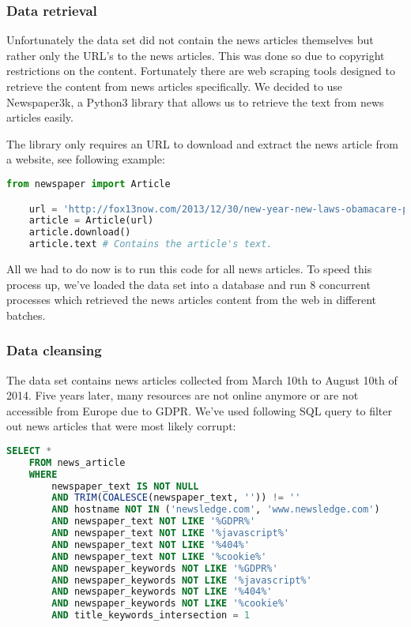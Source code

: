 \subsubsection{Data retrieval}
Unfortunately the data set did not contain the news articles themselves but rather only the URL's to the news articles.
This was done so due to copyright restrictions on the content.
Fortunately there are web scraping tools designed to retrieve the content from news articles specifically.
We decided to use Newspaper3k\cite{newspaper3k},
a Python3 library that allows us to retrieve the text from news articles easily.

The library only requires an URL to download and extract the news article from a website, see following example:

\begin{lstlisting}[language=Python, caption=Retrieve the news article from an URL., label={lst:newspaper3k_code}]
    from newspaper import Article

    url = 'http://fox13now.com/2013/12/30/new-year-new-laws-obamacare-pot-guns-and-drones/'
    article = Article(url)
    article.download()
    article.text # Contains the article's text.
\end{lstlisting}

All we had to do now is to run this code for all news articles.
To speed this process up, we've loaded the data set into a database and run 8 concurrent processes which
retrieved the news articles content from the web in different batches.

\subsubsection{Data cleansing}
The data set contains news articles collected from March 10th to August 10th of 2014.
Five years later, many resources are not online anymore or are not accessible from Europe due to GDPR.
We've used following SQL query to filter out news articles that were most likely corrupt:

\begin{lstlisting}[language=SQL, caption=Retrieve valid news articles., label={lst:valid_news_articles_sql}]
    SELECT *
    FROM news_article
    WHERE
        newspaper_text IS NOT NULL
        AND TRIM(COALESCE(newspaper_text, '')) != ''
        AND hostname NOT IN ('newsledge.com', 'www.newsledge.com')
        AND newspaper_text NOT LIKE '%GDPR%'
        AND newspaper_text NOT LIKE '%javascript%'
        AND newspaper_text NOT LIKE '%404%'
        AND newspaper_text NOT LIKE '%cookie%'
        AND newspaper_keywords NOT LIKE '%GDPR%'
        AND newspaper_keywords NOT LIKE '%javascript%'
        AND newspaper_keywords NOT LIKE '%404%'
        AND newspaper_keywords NOT LIKE '%cookie%'
        AND title_keywords_intersection = 1
\end{lstlisting}



